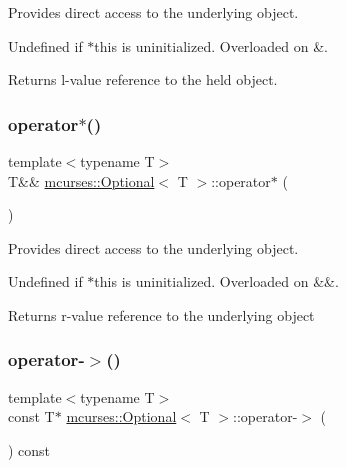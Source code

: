 Provides direct access to the underlying object. 

Undefined if $\ast$this is uninitialized. Overloaded on \&. \begin{DoxyReturn}{Returns}
l-\/value reference to the held object. 
\end{DoxyReturn}
\hypertarget{classmcurses_1_1Optional_aba889d24a53535305844ebcae23e6604}{}\label{classmcurses_1_1Optional_aba889d24a53535305844ebcae23e6604} 
\subsubsection{\texorpdfstring{operator$\ast$()}{operator*()}\hspace{0.1cm}{\footnotesize\ttfamily [3/3]}}
{\footnotesize\ttfamily template$<$typename T$>$ \\
T\&\& \hyperlink{classmcurses_1_1Optional}{mcurses\+::\+Optional}$<$ T $>$\+::operator$\ast$ (\begin{DoxyParamCaption}{ }\end{DoxyParamCaption})\hspace{0.3cm}{\ttfamily [inline]}}



Provides direct access to the underlying object. 

Undefined if $\ast$this is uninitialized. Overloaded on \&\&. \begin{DoxyReturn}{Returns}
r-\/value reference to the underlying object 
\end{DoxyReturn}
\hypertarget{classmcurses_1_1Optional_a4b2038d37bb6a17cac2904d7c82ce156}{}\label{classmcurses_1_1Optional_a4b2038d37bb6a17cac2904d7c82ce156} 
\subsubsection{\texorpdfstring{operator-\/$>$()}{operator->()}\hspace{0.1cm}{\footnotesize\ttfamily [1/2]}}
{\footnotesize\ttfamily template$<$typename T$>$ \\
const T$\ast$ \hyperlink{classmcurses_1_1Optional}{mcurses\+::\+Optional}$<$ T $>$\+::operator-\/$>$ (\begin{DoxyParamCaption}{ }\end{DoxyParamCaption}) const\hspace{0.3cm}{\ttfamily [inline]}}



